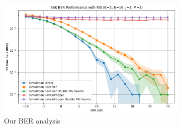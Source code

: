 
\begin{figure}[H]
  \centering
  \begin{subfigure}[b]{0.76\textwidth}
    \centering
    \includegraphics[width=\textwidth]{imgs/ber-simulations/SSK BER Performance with RIS (K=2, N=16, J=1, M=1) ci.pdf}
    \caption{Our BER analysis}
    \label{fig:simulation_j1_m1}
  \end{subfigure}
  \hfill
  \begin{subfigure}[b]{0.23\textwidth}
    \centering

\end{subfigure}
\end{figure}

